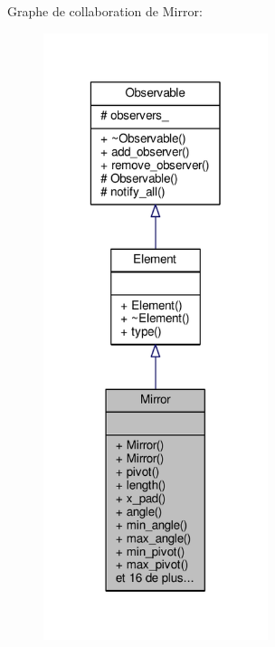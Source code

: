 Graphe de collaboration de Mirror\+:\nopagebreak
\begin{figure}[H]
\begin{center}
\leavevmode
\includegraphics[width=186pt]{dc/d9b/classMirror__coll__graph}
\end{center}
\end{figure}
